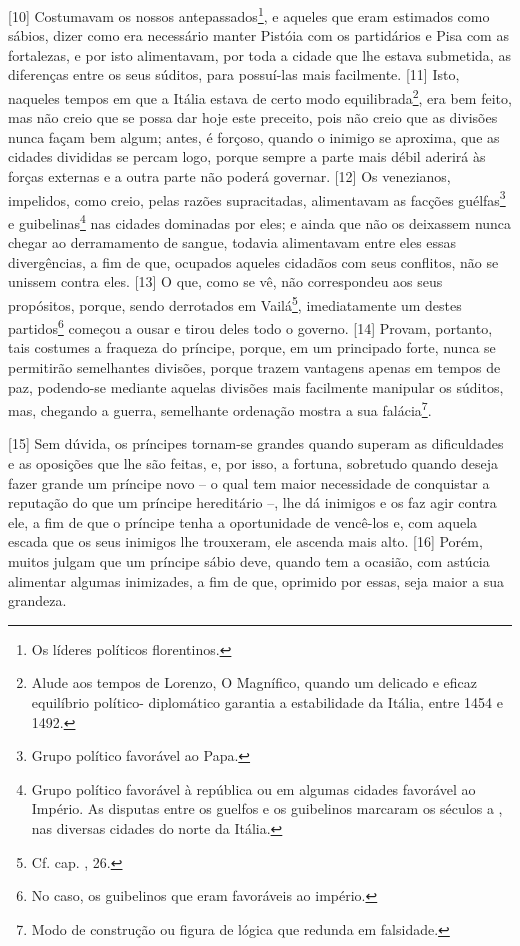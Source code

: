 {[}10{]} Costumavam os nossos antepassados\footnote{Os líderes políticos
  florentinos.}, e aqueles que eram estimados como sábios, dizer como
era necessário manter Pistóia com os partidários e Pisa com as
fortalezas, e por isto alimentavam, por toda a cidade que lhe estava
submetida, as diferenças entre os seus súditos, para possuí-las mais
facilmente. {[}11{]} Isto, naqueles tempos em que a Itália estava de
certo modo equilibrada\footnote{Alude aos tempos de Lorenzo, O
  Magnífico, quando um delicado e eficaz equilíbrio político-
  diplomático garantia a estabilidade da Itália, entre 1454 e 1492.},
era bem feito, mas não creio que se possa dar hoje este preceito, pois
não creio que as divisões nunca façam bem algum; antes, é forçoso,
quando o inimigo se aproxima, que as cidades divididas se percam logo,
porque sempre a parte mais débil aderirá às forças externas e a outra
parte não poderá governar. {[}12{]} Os venezianos, impelidos, como
creio, pelas razões supracitadas, alimentavam as facções
guélfas\footnote{Grupo político favorável ao Papa.} e
guibelinas\footnote{Grupo político favorável à república ou em algumas
  cidades favorável ao Império. As disputas entre os guelfos e os
  guibelinos marcaram os séculos  a , nas diversas cidades do
  norte da Itália.} nas cidades dominadas por eles; e ainda que não os
deixassem nunca chegar ao derramamento de sangue, todavia alimentavam
entre eles essas divergências, a fim de que, ocupados aqueles cidadãos
com seus conflitos, não se unissem contra eles. {[}13{]} O que, como se
vê, não correspondeu aos seus propósitos, porque, sendo derrotados em
Vailá\footnote{Cf. cap. , 26.}, imediatamente um destes
partidos\footnote{No caso, os guibelinos que eram favoráveis ao império.}
começou a ousar e tirou deles todo o governo. {[}14{]} Provam, portanto,
tais costumes a fraqueza do príncipe, porque, em um principado forte,
nunca se permitirão semelhantes divisões, porque trazem vantagens apenas
em tempos de paz, podendo-se mediante aquelas divisões mais facilmente
manipular os súditos, mas, chegando a guerra, semelhante ordenação
mostra a sua falácia\footnote{Modo de construção ou figura de lógica que
  redunda em falsidade.}.

{[}15{]} Sem dúvida, os príncipes tornam-se grandes quando superam as
dificuldades e as oposições que lhe são feitas, e, por isso, a fortuna,
sobretudo quando deseja fazer grande um príncipe novo -- o qual tem
maior necessidade de conquistar a reputação do que um príncipe
hereditário --, lhe dá inimigos e os faz agir contra ele, a fim de que o
príncipe tenha a oportunidade de vencê-los e, com aquela escada que os
seus inimigos lhe trouxeram, ele ascenda mais alto. {[}16{]} Porém,
muitos julgam que um príncipe sábio deve, quando tem a ocasião, com
astúcia alimentar algumas inimizades, a fim de que, oprimido por essas,
seja maior a sua grandeza.

